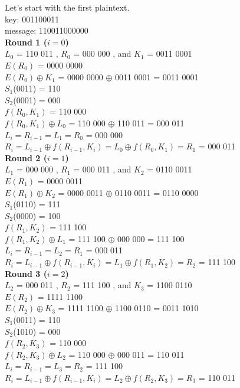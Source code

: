 \documentclass[12pt,letterpaper,final]{report}
\begin{document}
Let's start with the first plaintext. \\ 

key: 001100011 \\
message: 110011000000 \\

\textbf{Round 1 ($i = 0$) } \\

$L_0$ = 110 011 ,
$R_0$ = 000 000 , and 
$K_1$ = 0011 0001 \\
$E(R_0)$ = 0000 0000 \\
$E(R_0)  \oplus K_1 $  = 0000 0000 $ \oplus $ 0011 0001 = 0011 0001 \\
$S_1$(0011) = 110 \\
$S_2$(0001) = 000 \\
$f(R_0,K_1)$ = 110 000 \\
$f(R_0,K_1)  \oplus  L_0$ = 110 000 $ \oplus $ 110 011 = 000 011 \\
$L_i = R_{i-1} = L_1 = R_0$ = 000 000\\
$R_i = L_{i-1} \oplus f(R_{i-1},K_i) = L_0 \oplus f(R_0,K_1) = R_1$ = 000 011 \\


\textbf{Round 2 ($i = 1$) } \\

$L_1$ = 000 000 ,
$R_1$ = 000 011 , and 
$K_2$ = 0110 0011 \\
$E(R_1)$ = 0000 0011 \\
$E(R_1)  \oplus K_2 $  = 0000 0011 $ \oplus $ 0110 0011 = 0110 0000 \\
$S_1$(0110) = 111 \\
$S_2$(0000) = 100 \\
$f(R_1,K_2)$ = 111 100 \\
$f(R_1,K_2)  \oplus  L_1$ = 111 100 $ \oplus $ 000 000 = 111 100 \\
$L_i = R_{i-1} = L_2 = R_1$ = 000 011\\
$R_i = L_{i-1} \oplus f(R_{i-1},K_i) = L_1 \oplus f(R_1,K_2) = R_2$ = 111 100 \\


\textbf{Round 3 ($i = 2$) } \\

$L_2$ = 000 011 ,
$R_2$ = 111 100 , and 
$K_3$ =  1100 0110 \\
$E(R_2)$ = 1111 1100 \\
$E(R_2)  \oplus K_3 $  = 1111 1100 $ \oplus $ 1100 0110 = 0011 1010 \\
$S_1$(0011) = 110 \\
$S_2$(1010) = 000 \\
$f(R_2,K_3)$ = 110 000 \\
$f(R_2,K_3)  \oplus  L_2$ = 110 000 $ \oplus $ 000 011 = 110 011 \\
$L_i = R_{i-1} = L_3 = R_2$ = 111 100 \\
$R_i = L_{i-1} \oplus f(R_{i-1},K_i) = L_2 \oplus f(R_2,K_3) = R_3$ = 110 011 \\
\end{document}
